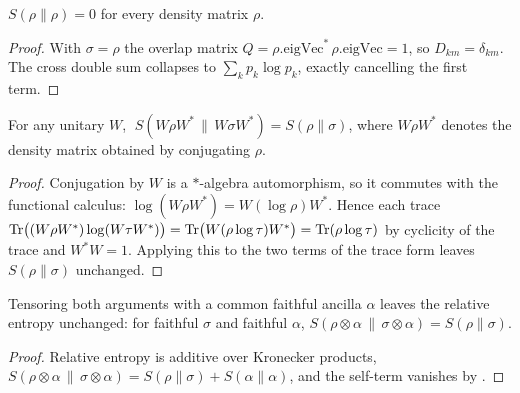 \begin{theorem}\label{relEntropy_self_eq_zero}
  \leanok
  \(S(\rho\|\rho) = 0\) for every density matrix \(\rho\).
\end{theorem}
\begin{proof}\leanok
  With \(\sigma = \rho\) the overlap matrix \(Q = \rho.\mathrm{eigVec}^{*}\,\rho.\mathrm{eigVec}
  = 1\), so \(D_{km} = \delta_{km}\). The cross double sum collapses to \(\sum_k p_k\log p_k\),
  exactly cancelling the first term.
\end{proof}

\begin{theorem}\label{relEntropy_conj_invariant}
  \leanok
  For any unitary \(W\), \(\;S(W\rho W^{*}\,\|\,W\sigma W^{*}) = S(\rho\|\sigma)\), where
  \(W\rho W^{*}\) denotes the density matrix
  obtained by conjugating \(\rho\).
\end{theorem}
\begin{proof}\leanok
  Conjugation by \(W\) is a \(*\)-algebra automorphism, so it commutes with the functional
  calculus: \(\log(W\rho W^{*}) = W(\log\rho)W^{*}\). Hence each trace
  \(\operatorname{Tr}\bigl((W\rho W^{*})\log(W\tau W^{*})\bigr) = \operatorname{Tr}\bigl(W(\rho\log\tau)W^{*}\bigr)
  = \operatorname{Tr}(\rho\log\tau)\) by cyclicity of the trace and \(W^{*}W = 1\). Applying this to the two
  terms of the trace form leaves \(S(\rho\|\sigma)\) unchanged.
\end{proof}

\begin{theorem}\label{relEntropy_ancilla_invariant}
  \leanok
  Tensoring both arguments with a common faithful ancilla \(\alpha\) leaves the relative entropy
  unchanged: for faithful \(\sigma\) and faithful \(\alpha\),
  \(S(\rho\otimes\alpha\,\|\,\sigma\otimes\alpha) = S(\rho\|\sigma)\).
\end{theorem}
\begin{proof}\leanok
  Relative entropy is additive over Kronecker products,
  \(S(\rho\otimes\alpha\,\|\,\sigma\otimes\alpha) = S(\rho\|\sigma) + S(\alpha\|\alpha)\), and the
  self-term vanishes by .
\end{proof}

